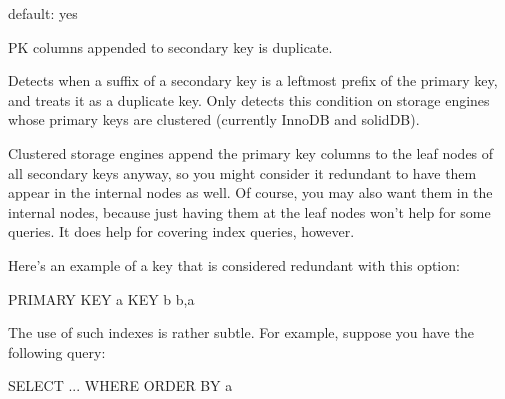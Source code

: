 \documentclass[letterpaper,10pt,english]{sphinxmanual}
\begin{document}

\begin{fulllineitems}
\label{\detokenize{mariadb-index-checker:cmdoption-mariadb-index-checker-no-clustered}}
\sphinxAtStartPar
default: yes

\sphinxAtStartPar
PK columns appended to secondary key is duplicate.

\sphinxAtStartPar
Detects when a suffix of a secondary key is a leftmost prefix of the primary
key, and treats it as a duplicate key.  Only detects this condition on storage
engines whose primary keys are clustered (currently InnoDB and solidDB).

\sphinxAtStartPar
Clustered storage engines append the primary key columns to the leaf nodes of
all secondary keys anyway, so you might consider it redundant to have them
appear in the internal nodes as well.  Of course, you may also want them in the
internal nodes, because just having them at the leaf nodes won’t help for some
queries.  It does help for covering index queries, however.

\sphinxAtStartPar
Here’s an example of a key that is considered redundant with this option:

\begin{sphinxVerbatim}[commandchars=\\\{\}]
PRIMARY KEY  a
KEY b b,a
\end{sphinxVerbatim}

\sphinxAtStartPar
The use of such indexes is rather subtle.  For example, suppose you have the
following query:

\begin{sphinxVerbatim}[commandchars=\\\{\}]
SELECT ... WHERE  ORDER BY a
\end{sphinxVerbatim}


\end{fulllineitems}
\end{document}
